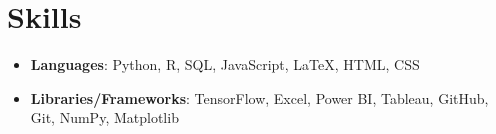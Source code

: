 \documentclass[letterpaper,10.8pt]{article}
\newcommand{\resumeItem}[2]{
  \item\small{
    \textbf{#1}{: #2 \vspace{-2pt}}
  }
}
\newcommand{\resumeSubItem}[2]{\resumeItem{#1}{#2}\vspace{-4pt}}
\newcommand{\resumeSubHeadingListStart}{\begin{itemize}[leftmargin=*]}
\newcommand{\resumeSubHeadingListEnd}{\end{itemize}}
\begin{document}
\section{Skills}
\resumeSubHeadingListStart
\resumeSubItem{Languages}{Python, R, SQL, JavaScript, LaTeX, HTML, CSS}
\resumeSubItem{Libraries/Frameworks}{TensorFlow, Excel, Power BI, Tableau, GitHub, Git, NumPy, Matplotlib}
\resumeSubHeadingListEnd

\end{document}
